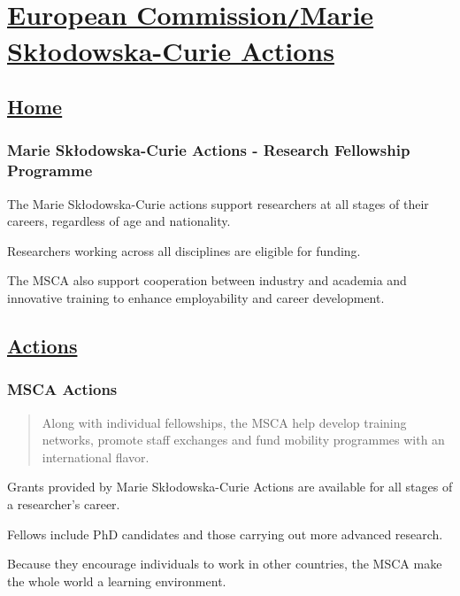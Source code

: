 \documentclass[oneside]{book}
\numberwithin{equation}{section}
\begin{document}

\chapter{\href{https://ec.europa.eu/research/mariecurieactions/actions/individual-fellowships_en}{European Commission\texttt{/}Marie Skłodowska-Curie Actions}}

\section{\href{https://ec.europa.eu/research/mariecurieactions/}{Home}}

\subsection{Marie Skłodowska-Curie Actions - Research Fellowship Programme}
The Marie Skłodowska-Curie actions support researchers at all stages of their careers, regardless of age and nationality.

Researchers working across all disciplines are eligible for funding.

The MSCA also support cooperation between industry and academia and innovative training to enhance employability and career development.

\section{\href{https://ec.europa.eu/research/mariecurieactions/msca-actions_en}{Actions}}

\subsection{MSCA Actions}
\begin{quotation}
    Along with individual fellowships, the MSCA help develop training networks, promote staff exchanges and fund mobility programmes with an international flavor.
\end{quotation}
Grants provided by Marie Skłodowska-Curie Actions are available for all stages of a researcher's career.

Fellows include PhD candidates and those carrying out more advanced research.

%
Because they encourage individuals to work in other countries, the MSCA make the whole world a learning environment.
\end{document}
